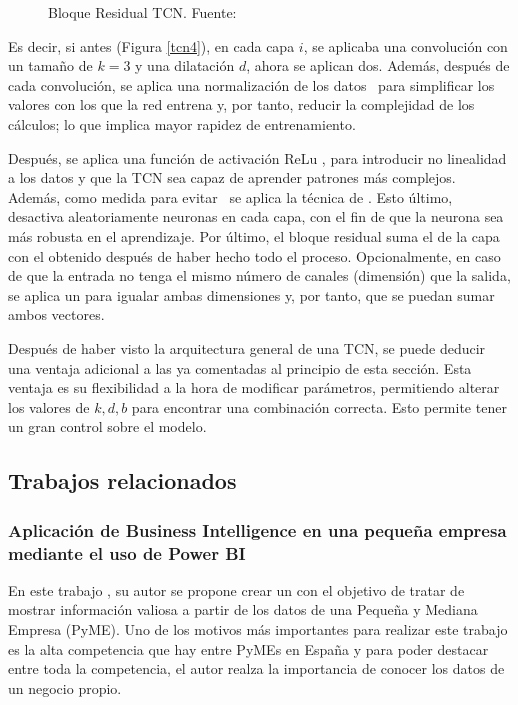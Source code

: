 {\begin{figure}[H]
\begin{tikzpicture}[overlay]
    \end{tikzpicture}
    \caption{Bloque Residual TCN. \scriptsize{Fuente: \parencite{TCNSeq}}}
    \label{tcn5}
\end{figure}

Es decir, si antes (Figura \ref{tcn4}), en cada capa $i$, se aplicaba una convolución con un tamaño de  $k = 3$ y una dilatación $d$, ahora se aplican dos. Además, después de cada convolución, se aplica una normalización de los datos \parencite{weightNormalization}\fnm\ para simplificar los valores con los que la red entrena y, por tanto, reducir la complejidad de los cálculos; lo que implica mayor rapidez de entrenamiento. 

Después, se aplica una función de activación ReLu \parencite{ReLu}, para introducir no linealidad a los datos y que la TCN sea capaz de aprender patrones más complejos. Además, como medida para evitar \fnm\ se aplica la técnica de  \parencite{dropout}. Esto último, desactiva aleatoriamente neuronas en cada capa, con el fin de que la neurona sea más robusta en el aprendizaje. Por último, el bloque residual suma el  de la  capa con el  obtenido después de haber hecho todo el proceso. Opcionalmente, en caso de que la entrada no tenga el mismo número de canales (dimensión) que la salida, se aplica un  para igualar ambas dimensiones y, por tanto, que se puedan sumar ambos vectores.

\addtocounter{footnote}{1}

Después de haber visto la arquitectura general de una TCN, se puede deducir una ventaja adicional a las ya comentadas al principio de esta sección. Esta ventaja es su flexibilidad a la hora de modificar parámetros, permitiendo alterar los valores de $k, d, b$ para encontrar una combinación correcta. Esto permite tener un gran control sobre el modelo.

\subsection{Trabajos relacionados}

\subsubsection{Aplicación de Business Intelligence en una pequeña empresa mediante el uso de Power BI}
En este trabajo \parencite{trabRel1}, su autor se propone crear un  con el objetivo de  tratar de mostrar información valiosa a partir de los datos de una Pequeña y Mediana Empresa (PyME). Uno de los motivos más  importantes para realizar este trabajo es la alta competencia que hay entre PyMEs en España y para poder destacar entre toda la competencia,  el autor realza la importancia de conocer los datos de un negocio propio.

}
